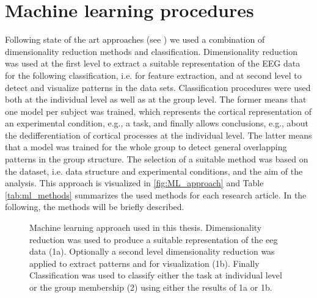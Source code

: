 \section{Machine learning procedures} 
Following state of the art approaches (see ) we used a combination of dimensionality reduction methods and classification. Dimensionality reduction was used at the first level to extract a suitable representation of the EEG data for the following classification, i.e. for feature extraction, and at second level to detect and visualize patterns in the data sets. Classification procedures were used both at the individual level as well as at the group level. The former means that one model per subject was trained, which represents the cortical representation of an experimental condition, e.g., a task, and finally allows conclusions, e.g., about the dedifferentiation of cortical processes at the individual level. The latter means that a model was trained for the whole group to detect general overlapping patterns in the group structure. The selection of a suitable method was based on the dataset, i.e. data structure and experimental conditions, and the aim of the analysis. This approach is visualized in \autoref{fig:ML_approach} and Table \autoref{tab:ml_methods}  summarizes the used methods for each research article. In the following, the methods will be briefly described.

\begin{figure}[h]
\begin{center}

\caption[Machine learning approach used in this thesis]{Machine learning approach used in this thesis. Dimensionality reduction was used to produce a suitable representation of the \gls{eeg} data (1a). Optionally a second level dimensionality reduction was applied to extract patterns and for visualization (1b). Finally Classification was used to classify either the task at individual level or the group membership (2) using either the results of 1a or 1b.}
\label{fig:ML_approach}
\end{center}
\end{figure}

